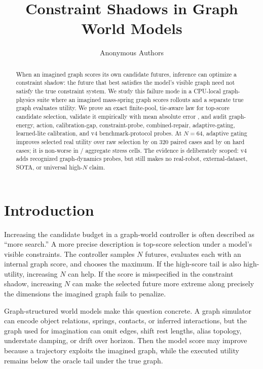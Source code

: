 \documentclass{article}
\title{Constraint Shadows in Graph World Models}
\author{Anonymous Authors}
\begin{document}
\maketitle

\begin{abstract}
When an imagined graph scores its own candidate futures, inference can optimize a constraint shadow: the future that best satisfies the model's visible graph need not satisfy the true constraint system.  We study this failure mode in a CPU-local graph-physics suite where an imagined mass-spring graph scores rollouts and a separate true graph evaluates utility.  We prove an exact finite-pool, tie-aware law for top-score candidate selection, validate it empirically with mean absolute error \VFourGraphExactError{}, and audit graph-energy, action, calibration-gap, constraint-probe, combined-repair, adaptive-gating, learned-lite calibration, and v4 benchmark-protocol probes.  At $N=64$, adaptive gating improves selected real utility over raw selection by \VFourGraphAllAdaptiveGain{} on 320 paired cases and by \VFourGraphHardAdaptiveGain{} on \VFourGraphHardCases{} hard cases; it is non-worse in \VFourGraphAdaptiveNonworseCells{}/\VFourGraphCellRows{} aggregate stress cells.  The evidence is deliberately scoped: v4 adds recognized graph-dynamics probes, but still makes no real-robot, external-dataset, SOTA, or universal high-\(N\) claim.
\end{abstract}

\section{Introduction}

Increasing the candidate budget in a graph-world controller is often described as ``more search.''  A more precise description is top-score selection under a model's visible constraints.  The controller samples $N$ futures, evaluates each with an internal graph score, and chooses the maximum.  If the high-score tail is also high-utility, increasing \(N\) can help.  If the score is misspecified in the constraint shadow, increasing \(N\) can make the selected future more extreme along precisely the dimensions the imagined graph fails to penalize.

Graph-structured world models make this question concrete.  A graph simulator can encode object relations, springs, contacts, or inferred interactions, but the graph used for imagination can omit edges, shift rest lengths, alias topology, understate damping, or drift over horizon.  Then the model score may improve because a trajectory exploits the imagined graph, while the executed utility remains below the oracle tail under the true graph.
\end{document}
